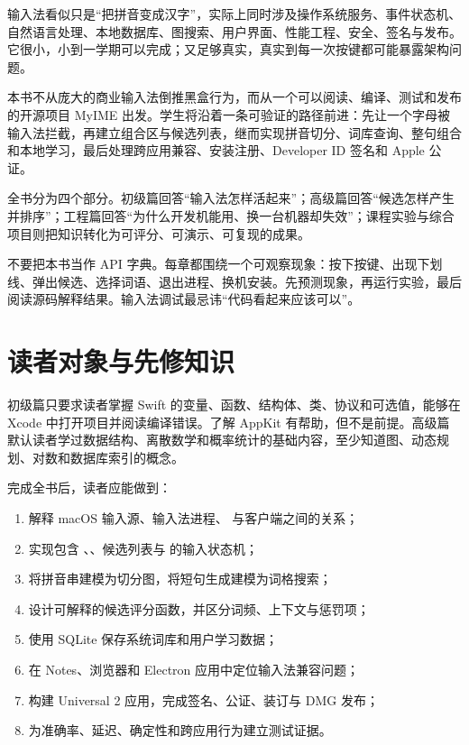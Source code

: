 输入法看似只是“把拼音变成汉字”，实际上同时涉及操作系统服务、事件状态机、自然语言处理、本地数据库、图搜索、用户界面、性能工程、安全、签名与发布。它很小，小到一学期可以完成；又足够真实，真实到每一次按键都可能暴露架构问题。

本书不从庞大的商业输入法倒推黑盒行为，而从一个可以阅读、编译、测试和发布的开源项目 MyIME 出发。学生将沿着一条可验证的路径前进：先让一个字母被输入法拦截，再建立组合区与候选列表，继而实现拼音切分、词库查询、整句组合和本地学习，最后处理跨应用兼容、安装注册、Developer ID 签名和 Apple 公证。

全书分为四个部分。初级篇回答“输入法怎样活起来”；高级篇回答“候选怎样产生并排序”；工程篇回答“为什么开发机能用、换一台机器却失效”；课程实验与综合项目则把知识转化为可评分、可演示、可复现的成果。

\begin{concept}[学习方法]
不要把本书当作 API 字典。每章都围绕一个可观察现象：按下按键、出现下划线、弹出候选、选择词语、退出进程、换机安装。先预测现象，再运行实验，最后阅读源码解释结果。输入法调试最忌讳“代码看起来应该可以”。
\end{concept}

\chapter*{读者对象与先修知识}

初级篇只要求读者掌握 Swift 的变量、函数、结构体、类、协议和可选值，能够在 Xcode 中打开项目并阅读编译错误。了解 AppKit 有帮助，但不是前提。高级篇默认读者学过数据结构、离散数学和概率统计的基础内容，至少知道图、动态规划、对数和数据库索引的概念。

完成全书后，读者应能做到：

\begin{enumerate}
  \item 解释 macOS 输入源、输入法进程、 与客户端之间的关系；
  \item 实现包含 、、候选列表与  的输入状态机；
  \item 将拼音串建模为切分图，将短句生成建模为词格搜索；
  \item 设计可解释的候选评分函数，并区分词频、上下文与惩罚项；
  \item 使用 SQLite 保存系统词库和用户学习数据；
  \item 在 Notes、浏览器和 Electron 应用中定位输入法兼容问题；
  \item 构建 Universal 2 应用，完成签名、公证、装订与 DMG 发布；
  \item 为准确率、延迟、确定性和跨应用行为建立测试证据。
\end{enumerate}

